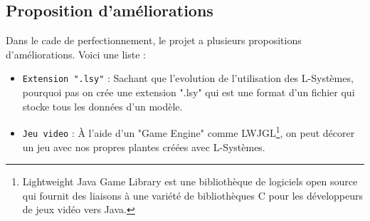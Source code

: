     \subsection{Proposition d'améliorations}
    \begin{onehalfspace}
        \Large{Dans le cade de perfectionnement, le projet a plusieurs propositions d'améliorations. Voici une liste :}
         \vspace{0.5cm}
      \begin{itemize}
          \item \texttt{Extension ".lsy"} : \Large{Sachant que l'evolution de l'utilisation des L-Systèmes, pourquoi pas on crée une extension ".lsy" qui est une format d'un fichier qui stocke tous les données d'un modèle.}
        \vspace{0.5cm}
          \item \texttt{Jeu video} : \Large{À l'aide d'un "Game Engine" comme LWJGL\footnote{Lightweight Java Game Library est une bibliothèque de logiciels open source qui fournit des liaisons à une variété de bibliothèques C pour les développeurs de jeux vidéo vers Java.}, on peut décorer un jeu avec nos propres plantes créées avec L-Systèmes. }
       
      \end{itemize}
       
        
        \Large{}
        \Large{}
    \end{onehalfspace}
    
    







